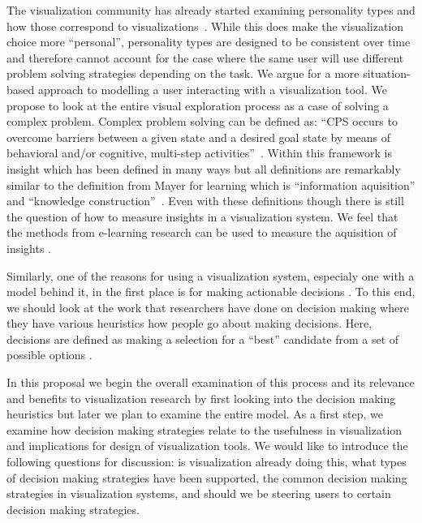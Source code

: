 The visualization community has already started examining personality types and
how those correspond to visualizations~\citep{Conati:2014}. While this does make the visualization
choice more ``personal'', personality types are designed to be
consistent over time and therefore cannot account for the case where the same
user will use different problem solving strategies depending on the
task. We argue for a more situation-based approach to modelling a
user interacting with a visualization tool. We propose to look at the entire
visual exploration process as a case of solving a complex problem. Complex
problem solving can be defined as: ``CPS occurs to overcome barriers between a
given state and a desired goal state by means of behavioral and/or cognitive,
multi-step activities''~\citep{Frensch:2005}. Within this framework is insight
which has been defined in many ways but all definitions are remarkably similar
to the definition from Mayer for learning which is ``information aquisition''
and ``knowledge construction''~\citep{Mayer:2009}. Even with these definitions though
there is still the question of how to measure insights in a visualization
system. We feel that the methods from e-learning research can be used to
measure the aquisition of insights .

Similarly, one of the reasons for using a visualization system, especialy one
with a model behind it, in the first place is for making actionable decisions
. To this end, we should look at the work that
researchers have done on decision making where they have various heuristics how
people go about making decisions. Here, decisions are defined as making a
selection for a ``best'' candidate from a set of possible options 
 .

In this proposal we begin the overall examination of this process and its
relevance and benefits to visualization research by first looking into the
decision making heuristics but later we plan to examine the entire model.  As a
first step, we examine how decision making strategies relate to the usefulness
in visualization and implications for design of visualization
tools.  We would like to introduce the
following questions for discussion: is visualization already doing this, what
types of decision making strategies have been supported, the common decision
making strategies in visualization systems, and should we be steering users to
certain decision making strategies.

